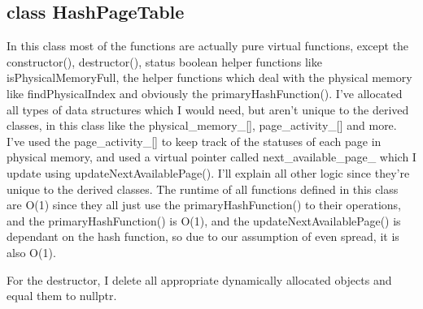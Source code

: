 \subsection{{\color{orange}class} {\color{draculapurple}HashPageTable}}
    In this class most of the functions are actually pure virtual functions, except the {\color{draculapurple}constructor()}, {\color{draculapurple}destructor()},
    status boolean helper functions like {\color{draculapurple}isPhysicalMemoryFull}, the helper functions which deal with the
    physical memory like {\color{draculapurple}findPhysicalIndex{}} and obviously the {\color{draculapurple}primaryHashFunction()}.
    I've allocated all types of data structures which I would need, but aren't unique to the derived classes, in this class like the
        {\color{Turquoise}physical\_memory\_[]}, {\color{Turquoise}page\_activity\_[]} and more. I've used the {\color{Turquoise}page\_activity\_[]}
    to keep track of the statuses of each page in physical memory, and used a virtual pointer called {\color{Turquoise}next\_available\_page\_} which I update using {\color{draculapurple}updateNextAvailablePage()}.
    I'll explain all other logic since they're unique to the derived classes. The runtime of all functions defined in this class are {\color{lightblue}O(1)} since they all just use the
    {\color{draculapurple}primaryHashFunction()} to their operations, and the {\color{draculapurple}primaryHashFunction()} is {\color{lightblue}O(1)},
    and the {\color{draculapurple}updateNextAvailablePage()} is dependant on the hash function, so due to our assumption of even spread, it is also {\color{lightblue}O(1)}.

    For the destructor, I delete all appropriate dynamically allocated objects and equal them to {\color{LightPink}nullptr}.

